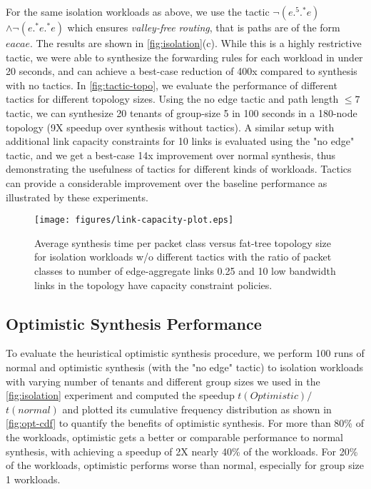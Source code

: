 For the same isolation workloads as above, we use the tactic $\neg (e .^5 .^* e)$ $\wedge \neg (e .^* e .^* e)$
 which ensures {\em valley-free routing}, that is paths are of the form $eacae$. 
 The results are shown in \cref{fig:isolation}(c). 
 While this is a highly
 restrictive tactic, we were able to synthesize the forwarding rules for each workload in under 20 seconds, 
 and can achieve a best-case reduction of 400x compared to synthesis with no tactics. In \cref{fig:tactic-topo},
 we evaluate the performance of different tactics for different topology sizes. Using the no edge tactic
 and path length $\leq 7$ tactic, we can synthesize 20 tenants of group-size 5 in 100 seconds in a 180-node
 topology (9X speedup over synthesis without tactics). A similar setup with additional link capacity 
 constraints for 10 links is evaluated using the "no edge" tactic, and we get a best-case 14x
 improvement over normal synthesis, thus demonstrating the usefulness of tactics for 
 different kinds of workloads. Tactics can provide 
 a considerable improvement over the baseline performance as illustrated by these experiments. 

\begin{figure}[h]
	\texttt{[image: figures/link-capacity-plot.eps]}
	\caption{Average synthesis time per packet class versus fat-tree topology size for isolation workloads 
		w/o different tactics with the ratio of packet classes to number of edge-aggregate links 0.25 and 10 low bandwidth links in the topology 
		have capacity constraint policies.}
	\label{fig:link-capacity}
\end{figure}


\subsection{Optimistic Synthesis Performance} \label{sec:optimisticeval}
To evaluate the heuristical optimistic synthesis procedure, we perform 100 runs of normal and optimistic synthesis (with the "no edge" tactic) to isolation
 workloads with varying number of tenants and different group sizes 
we used in the \cref{fig:isolation} experiment and computed the
 speedup $t(Optimistic)/$ $t(normal)$ and plotted its cumulative frequency
  distribution as shown in \cref{fig:opt-cdf} to quantify the benefits of optimistic 
  synthesis. For more than 80\% of the
workloads, optimistic gets a better or comparable performance to normal synthesis, with
achieving a speedup of 2X nearly 40\% of the workloads. For 20\% of the workloads, optimistic
performs worse than normal, especially for group size 1 workloads.

